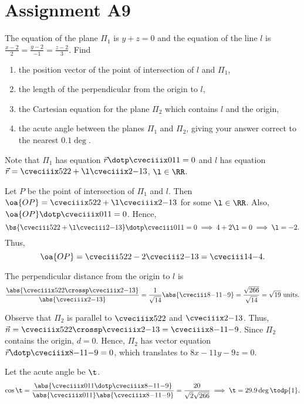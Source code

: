 \section{Assignment A9}

\begin{problem}
    The equation of the plane $\Pi_1$ is $y + z = 0$ and the equation of the line $l$ is $\frac{x-2}2 = \frac{y-2}{-1} = \frac{z-2}3$. Find
    \begin{enumerate}
        \item the position vector of the point of intersection of $l$ and $\Pi_1$,
        \item the length of the perpendicular from the origin to $l$,
        \item the Cartesian equation for the plane $\Pi_2$ which contains $l$ and the origin,
        \item the acute angle between the planes $\Pi_1$ and $\Pi_2$, giving your answer correct to the nearest $0.1 \deg$.
    \end{enumerate}
\end{problem}
\begin{solution}
    Note that $\Pi_1$ has equation $\vec r \dotp \cveciiix011 = 0$ and $l$ has equation $\vec r = \cveciiix522 + \l \cveciiix2{-1}3$, $\l \in \RR$.

    \begin{ppart}
        Let $P$ be the point of intersection of $\Pi_1$ and $l$. Then $\oa{OP} = \cveciiix522 + \l \cveciiix2{-1}3$ for some $\l \in \RR$. Also, $\oa{OP} \dotp \cveciiix011 = 0$. Hence, \[\bs{\cveciii522 + \l \cveciii2{-1}3} \dotp \cveciii011 = 0 \implies 4 + 2\l = 0 \implies \l = -2.\] Thus, \[\oa{OP} = \cveciii522 - 2\cveciii2{-1}3 = \cveciii14{-4}.\]
    \end{ppart}
    \begin{ppart}
        The perpendicular distance from the origin to $l$ is \[\frac{\abs{\cveciiix522 \crossp \cveciiix2{-1}3}}{\abs{\cveciiix2{-1}3}} = \frac1{\sqrt{14}} \abs{\cveciii8{-11}{-9}} = \frac{\sqrt{266}}{\sqrt{14}} = \sqrt{19} \text{ units}.\]
    \end{ppart}
    \begin{ppart}
        Observe that $\Pi_2$ is parallel to $\cveciiix522$ and $\cveciiix2{-1}3$. Thus, $\vec n = \cveciiix522 \crossp \cveciiix2{-1}3 = \cveciiix8{-11}{-9}$. Since $\Pi_2$ contains the origin, $d = 0$. Hence, $\Pi_2$ has vector equation $\vec r \dotp \cveciiix8{-11}{-9} = 0$, which translates to $8x - 11y - 9z = 0$.
    \end{ppart}
    \begin{ppart}
        Let the acute angle be $\t$. \[\cos\t = \frac{\abs{\cveciiix011 \dotp \cveciiix8{-11}{-9}}}{\abs{\cveciiix011}\abs{\cveciiix8{-11}{-9}}} = \frac{20}{\sqrt{2}\sqrt{266}} \implies \t = 29.9\deg \todp{1}.\]
    \end{ppart}
\end{solution}

